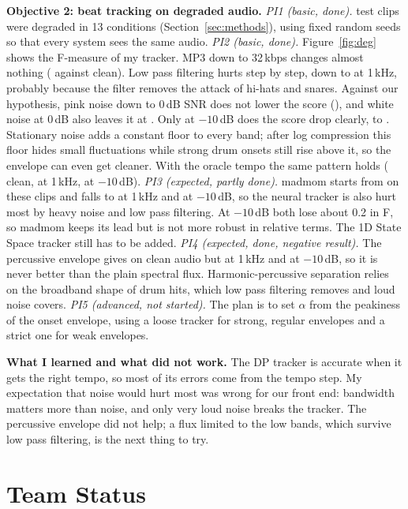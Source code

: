 \documentclass{article}
\begin{document}
\textbf{Objective 2: beat tracking on degraded audio.}
\emph{PI1 (basic, done).} \NDeg{} test clips were degraded in 13 conditions (Section~\ref{sec:methods}), using fixed random seeds so that every system sees the same audio.
\emph{PI2 (basic, done).} Figure~\ref{fig:deg} shows the F-measure of my tracker. MP3 down to 32\,kbps changes almost nothing (\DegMPThree{} against \DegClean{} clean). Low pass filtering hurts step by step, down to \DegLPOne{} at 1\,kHz, probably because the filter removes the attack of hi-hats and snares. Against our hypothesis, pink noise down to 0\,dB SNR does not lower the score (\DegNoiseZero{}), and white noise at 0\,dB also leaves it at \DegWhite{}. Only at $-10$\,dB does the score drop clearly, to \DegNoiseMinusTen{}. Stationary noise adds a constant floor to every band; after log compression this floor hides small fluctuations while strong drum onsets still rise above it, so the envelope can even get cleaner. With the oracle tempo the same pattern holds (\DegOrClean{} clean, \DegOrLPOne{} at 1\,kHz, \DegOrNoiseMinusTen{} at $-10$\,dB).
\emph{PI3 (expected, partly done).} madmom starts from \MadDegClean{} on these clips and falls to \MadDegLPOne{} at 1\,kHz and \MadDegNoiseMinusTen{} at $-10$\,dB, so the neural tracker is also hurt most by heavy noise and low pass filtering. At $-10$\,dB both lose about 0.2 in F, so madmom keeps its lead but is not more robust in relative terms. The 1D State Space tracker \cite{heydari} still has to be added.
\emph{PI4 (expected, done, negative result).} The percussive envelope gives \PercClean{} on clean audio but \PercLPOne{} at 1\,kHz and \PercNoiseMinusTen{} at $-10$\,dB, so it is never better than the plain spectral flux. Harmonic-percussive separation relies on the broadband shape of drum hits, which low pass filtering removes and loud noise covers.
\emph{PI5 (advanced, not started).} The plan is to set $\alpha$ from the peakiness of the onset envelope, using a loose tracker for strong, regular envelopes and a strict one for weak envelopes.

\textbf{What I learned and what did not work.} The DP tracker is accurate when it gets the right tempo, so most of its errors come from the tempo step. My expectation that noise would hurt most was wrong for our front end: bandwidth matters more than noise, and only very loud noise breaks the tracker. The percussive envelope did not help; a flux limited to the low bands, which survive low pass filtering, is the next thing to try.

\section{Team Status}
\label{sec:team}
\end{document}
